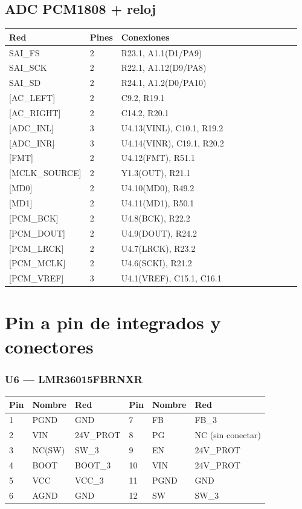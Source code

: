 \documentclass[10pt,a4paper]{article}
\begin{document}
\subsection*{ADC PCM1808 + reloj}
{\footnotesize\begin{longtable}{@{}L{0.2\linewidth}L{0.06\linewidth}L{0.7\linewidth}@{}}\toprule
\textbf{Red} & \textbf{Pines} & \textbf{Conexiones}\\\midrule\endhead
SAI\_\allowbreak{}FS & 2 & R23.1, A1.1(D1/PA9)\\
SAI\_\allowbreak{}SCK & 2 & R22.1, A1.12(D9/PA8)\\
SAI\_\allowbreak{}SD & 2 & R24.1, A1.2(D0/PA10)\\
{[}AC\_\allowbreak{}LEFT{]} & 2 & C9.2, R19.1\\
{[}AC\_\allowbreak{}RIGHT{]} & 2 & C14.2, R20.1\\
{[}ADC\_\allowbreak{}INL{]} & 3 & U4.13(VINL), C10.1, R19.2\\
{[}ADC\_\allowbreak{}INR{]} & 3 & U4.14(VINR), C19.1, R20.2\\
{[}FMT{]} & 2 & U4.12(FMT), R51.1\\
{[}MCLK\_\allowbreak{}SOURCE{]} & 2 & Y1.3(OUT), R21.1\\
{[}MD0{]} & 2 & U4.10(MD0), R49.2\\
{[}MD1{]} & 2 & U4.11(MD1), R50.1\\
{[}PCM\_\allowbreak{}BCK{]} & 2 & U4.8(BCK), R22.2\\
{[}PCM\_\allowbreak{}DOUT{]} & 2 & U4.9(DOUT), R24.2\\
{[}PCM\_\allowbreak{}LRCK{]} & 2 & U4.7(LRCK), R23.2\\
{[}PCM\_\allowbreak{}MCLK{]} & 2 & U4.6(SCKI), R21.2\\
{[}PCM\_\allowbreak{}VREF{]} & 3 & U4.1(VREF), C15.1, C16.1\\
\bottomrule\end{longtable}}
\section{Pin a pin de integrados y conectores}
\subsubsection*{U6 — LMR36015FBRNXR}
{\footnotesize\begin{tabular}{@{}lll|lll@{}}\toprule
\textbf{Pin} & \textbf{Nombre} & \textbf{Red} & \textbf{Pin} & \textbf{Nombre} & \textbf{Red}\\\midrule
1 & PGND & GND & 7 & FB & FB\_\allowbreak{}3\\
2 & VIN & 24V\_\allowbreak{}PROT & 8 & PG & NC (sin conectar)\\
3 & NC(SW) & SW\_\allowbreak{}3 & 9 & EN & 24V\_\allowbreak{}PROT\\
4 & BOOT & BOOT\_\allowbreak{}3 & 10 & VIN & 24V\_\allowbreak{}PROT\\
5 & VCC & VCC\_\allowbreak{}3 & 11 & PGND & GND\\
6 & AGND & GND & 12 & SW & SW\_\allowbreak{}3\\
\bottomrule\end{tabular}}
\end{document}
